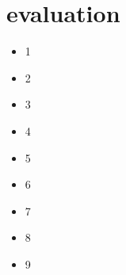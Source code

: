 \section{evaluation}
\label{sec:evaluation}
\begin{itemize}

\item 1

\item 2

\item 3

\item 4

\item 5

\item 6

\item 7

\item 8

\item 9
\end{itemize}
